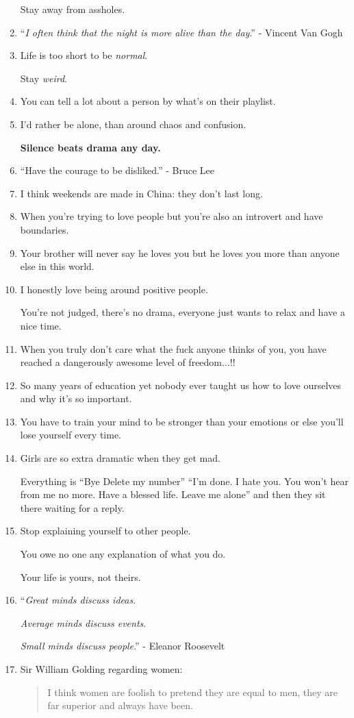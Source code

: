 \documentclass{article}
\begin{document}
\begin{enumerate}
	Stay away from assholes.
	\item ``\textit{I often think that the night is more alive than the day}.'' - Vincent Van Gogh
	\item Life is too short to be \textit{normal}.
	
	Stay \textit{weird}.
	\item You can tell a lot about a person by what's on their playlist.
	\item I'd rather be alone, than around chaos and confusion.
	
	\textbf{Silence beats drama any day.}
	\item ``Have the courage to be disliked.'' - Bruce Lee
	\item I think weekends are made in China: they don't last long.
	\item When you're trying to love people but you're also an introvert and have boundaries.
	\item Your brother will never say he loves you but he loves you more than anyone else in this world.
	\item I honestly love being around positive people.
	
	You're not judged, there's no drama, everyone just wants to relax and have a nice time.
	\item When you truly don't care what the fuck anyone thinks of you, you have reached a dangerously awesome level of freedom$\ldots$!!
	\item So many years of education yet nobody ever taught us how to love ourselves and why it's so important.
	\item You have to train your mind to be stronger than your emotions or else you'll lose yourself every time.
	\item Girls are so extra dramatic when they get mad.
	
	Everything is ``Bye Delete my number'' ``I'm done. I hate you. You won't hear from me no more. Have a blessed life. Leave me alone'' and then they sit there waiting for a reply.
	\item Stop explaining yourself to other people.
	
	You owe no one any explanation of what you do.
	
	Your life is yours, not theirs.
	\item ``\textit{Great minds discuss ideas}.
	
	\textit{Average minds discuss events}.
	
	\textit{Small minds discuss people}.'' - Eleanor Roosevelt
	\item Sir William Golding regarding women:
	\begin{quotation}
		I think women are foolish to pretend they are equal to men, they are far superior and always have been.
		

\end{quotation}
\end{enumerate}
\end{document}
